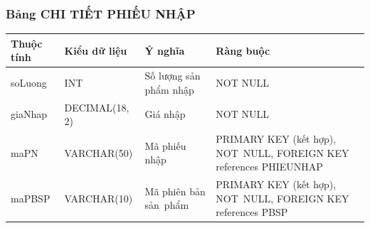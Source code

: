 \documentclass[a4paper,12pt]{report}
\begin{document}
\subsubsection{Bảng CHI TIẾT PHIẾU NHẬP}
\noindent
\begin{center}
    \begin{longtable}{|>{\centering\arraybackslash}p{3cm}|
        >{\centering\arraybackslash}p{4cm}|
        >{\centering\arraybackslash}p{4cm}|
        >{\centering\arraybackslash}p{4cm}|}
        \hline
        \textbf{Thuộc tính}                                                                                                               &
        \textbf{Kiểu dữ liệu}                                                                                                                             &
        \textbf{Ý nghĩa}                                                                                                 &
        \textbf{Ràng buộc}                                                                                                         \\
        \hline
        soLuong &  INT  & Số lượng sản phẩm nhập & NOT NULL \\
        \hline
        giaNhap &  DECIMAL(18, 2)  & Giá nhập & NOT NULL \\                                                                                                                          
        \hline
        maPN & VARCHAR(50) & Mã phiếu nhập & PRIMARY KEY (kết hợp), NOT~NULL, FOREIGN KEY references PHIEUNHAP \\                                                                                                                          
        \hline
        maPBSP &  VARCHAR(10)  & Mã phiên bản sản~phẩm & PRIMARY KEY (kết hợp), NOT~NULL, FOREIGN KEY references PBSP \\
        \hline
    \end{longtable}
\end{center}
\end{document}
